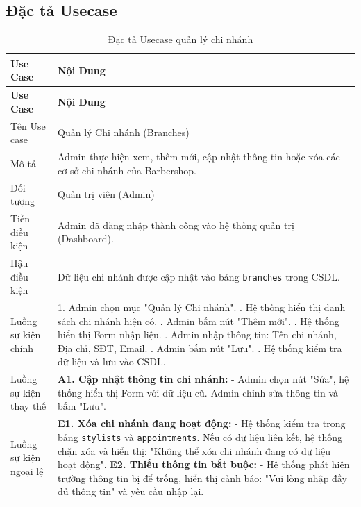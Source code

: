 \documentclass[../BTL.tex]{subfiles}
\begin{document}
\subsection{Đặc tả Usecase}
\begin{longtable}{|p{}|p{}|}
\caption{Đặc tả Usecase quản lý chi nhánh}\label{tab:usecase-quan-ly-chi-nhanh}\\
\hline
\textbf{Use Case} & \textbf{Nội Dung} \\
\hline
\endfirsthead
\hline
\textbf{Use Case} & \textbf{Nội Dung} \\
\hline
\endhead
Tên Use case & Quản lý Chi nhánh (Branches) \\
\hline
Mô tả & Admin thực hiện xem, thêm mới, cập nhật thông tin hoặc xóa các cơ sở chi nhánh của Barbershop. \\
\hline
Đối tượng & Quản trị viên (Admin) \\
\hline
Tiền điều kiện & Admin đã đăng nhập thành công vào hệ thống quản trị (Dashboard). \\
\hline
Hậu điều kiện & Dữ liệu chi nhánh được cập nhật vào bảng \texttt{branches} trong CSDL. \\
\hline
Luồng sự kiện chính & 
1. Admin chọn mục "Quản lý Chi nhánh". \newline
2. Hệ thống hiển thị danh sách chi nhánh hiện có. \newline
3. Admin bấm nút "Thêm mới". \newline
4. Hệ thống hiển thị Form nhập liệu. \newline
5. Admin nhập thông tin: Tên chi nhánh, Địa chỉ, SĐT, Email. \newline
6. Admin bấm nút "Lưu". \newline
7. Hệ thống kiểm tra dữ liệu và lưu vào CSDL. \\
\hline
Luồng sự kiện thay thế & 
\textbf{A1. Cập nhật thông tin chi nhánh:} \newline
- Admin chọn nút "Sửa", hệ thống hiển thị Form với dữ liệu cũ. Admin chỉnh sửa thông tin và bấm "Lưu". \\
\hline
Luồng sự kiện ngoại lệ & 
\textbf{E1. Xóa chi nhánh đang hoạt động:} \newline
- Hệ thống kiểm tra trong bảng \texttt{stylists} và \texttt{appointments}. Nếu có dữ liệu liên kết, hệ thống chặn xóa và hiển thị: "Không thể xóa chi nhánh đang có dữ liệu hoạt động". \newline
\textbf{E2. Thiếu thông tin bắt buộc:} \newline
- Hệ thống phát hiện trường thông tin bị để trống, hiển thị cảnh báo: "Vui lòng nhập đầy đủ thông tin" và yêu cầu nhập lại. \\
\hline
\end{longtable}
\end{document}
